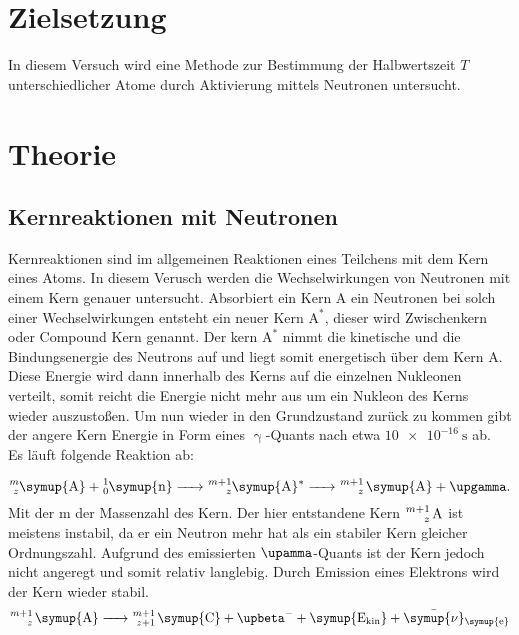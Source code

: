 \section{Zielsetzung}
In diesem Versuch wird eine Methode zur Bestimmung der Halbwertszeit $T$ unterschiedlicher Atome durch Aktivierung mittels Neutronen untersucht.


\section{Theorie}

\subsection{Kernreaktionen mit Neutronen}

\noindent Kernreaktionen sind im allgemeinen Reaktionen eines Teilchens mit dem Kern eines Atoms. In diesem Verusch werden die Wechselwirkungen 
von Neutronen mit einem Kern genauer untersucht. Absorbiert ein Kern A ein Neutronen bei solch einer Wechselwirkungen entsteht ein neuer Kern
$\text{A}^{\ast}$, dieser wird Zwischenkern oder Compound Kern genannt. Der kern $\text{A}^{\ast}$ nimmt die kinetische und die Bindungsenergie 
des Neutrons auf und liegt somit energetisch über dem Kern A. Diese Energie wird dann innerhalb des Kerns auf die einzelnen Nukleonen verteilt, 
somit reicht die Energie nicht mehr aus um ein Nukleon des Kerns wieder auszustoßen. Um nun wieder in den Grundzustand zurück zu kommen gibt der 
angere Kern Energie in Form eines $\upgamma$-Quants nach etwa $\SI{10e-16}{\second}$ ab.\\
Es läuft folgende Reaktion ab:

\begin{equation}
   \ce{^m_z\symup{A} + ^1_0\symup{n} -> ^{m+1}_z\symup{A}^{\ast} -> ^{m+1}_z \symup{A} + \upgamma }. \nonumber
\end{equation}
Mit der m der Massenzahl des Kern. Der hier entstandene Kern $\ce{^{m+1}_z \text{A}}$ ist meistens instabil, da er ein Neutron mehr hat als ein 
stabiler Kern gleicher Ordnungszahl. Aufgrund des emissierten $\upamma$-Quants ist der Kern jedoch nicht angeregt und somit relativ langlebig.
Durch Emission eines Elektrons wird der Kern wieder stabil.
\begin{equation}
   \ce{^{m+1}_z \symup{A} -> ^{m+1}_{z+1} \symup{C} + \upbeta^- + \symup{E_{kin}} + \bar{\symup{\nu}}_{\symup{e}}} \nonumber
\end{equation}

